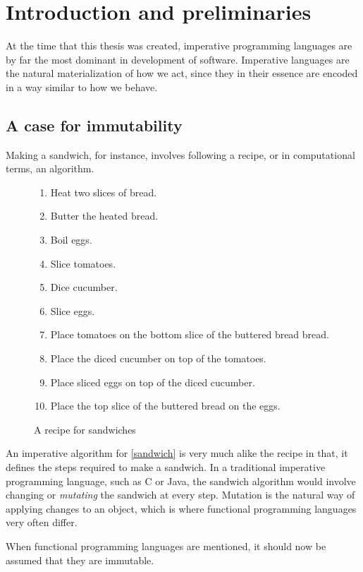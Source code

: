 \chapter{Introduction and preliminaries}
At the time that this thesis was created, imperative programming languages are by far the most dominant in development of software.
Imperative languages are the natural materialization of how we act, since they in their essence are encoded in a way similar to how we behave.

\section{A case for immutability}
Making a sandwich, for instance, involves following a recipe, or in computational terms, an algorithm.
\begin{figure}[ht]
  \begin{enumerate}
    \item Heat two slices of bread.
    \item Butter the heated bread.
    \item Boil eggs.\label{boil}
    \item Slice tomatoes\label{tomatoes}.
    \item Dice cucumber.\label{dice}
    \item Slice eggs.
    \item Place tomatoes on the bottom slice of the buttered bread bread.
    \item Place the diced cucumber on top of the tomatoes.
    \item Place sliced eggs on top of the diced cucumber.
    \item Place the top slice of the buttered bread on the eggs. 
  \end{enumerate}
  \caption{A recipe for sandwiches}
  \label{sandwich}
\end{figure}
An imperative algorithm for \autoref{sandwich} is very much alike the recipe in that, it defines the steps required to make a sandwich.
In a traditional imperative programming language, such as C or Java, the sandwich algorithm would involve changing or \textit{mutating} the sandwich at every step.
Mutation is the natural way of applying changes to an object, which is where functional programming languages very often differ.
\begin{remark}
When functional programming languages are mentioned, it should now be assumed that they are immutable.
\end{remark}

